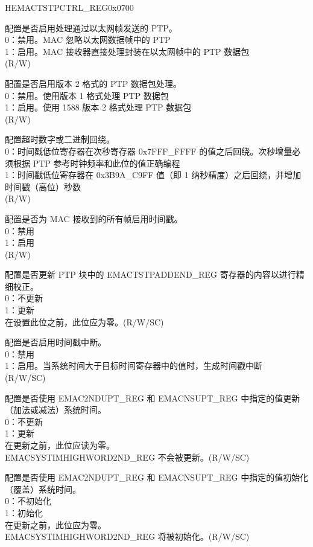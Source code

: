 \addtocounter{Regfloat}{-1}
\begin{register}{H}{EMACTSTPCTRL\_REG}{0x0700}
\begin{regdesc}\begin{reglist}
\item [接上页...]

\item [TSIPENA] 配置是否启用处理通过以太网帧发送的 PTP。\\
0：禁用。MAC 忽略以太网数据帧中的 PTP\\
1：启用。MAC 接收器直接处理封装在以太网帧中的 PTP 数据包\\(R/W)
\item [TSVER2ENA] 配置是否启用版本 2 格式的 PTP 数据包处理。\\
0：禁用。使用版本 1 格式处理 PTP 数据包\\
1：启用。使用 1588 版本 2 格式处理 PTP 数据包\\(R/W)
\item [TSCTRLSSR] 配置超时数字或二进制回绕。\\
0：时间戳低位寄存器在次秒寄存器 0x7FFF\_FFFF 的值之后回绕。次秒增量必须根据 PTP 参考时钟频率和此位的值正确编程\\
1：时间戳低位寄存器在 0x3B9A\_C9FF 值（即 1 纳秒精度）之后回绕，并增加时间戳（高位）秒数\\
(R/W)
\item [TSENALL] 配置是否为 MAC 接收到的所有帧启用时间戳。\\
0：禁用\\
1：启用\\(R/W)
\item [TSADDREG] 配置是否更新 PTP 块中的 EMACTSTPADDEND\_REG 寄存器的内容以进行精细校正。\\
0：不更新\\
1：更新\\
在设置此位之前，此位应为零。(R/W/SC)
\item [TSTRIG] 配置是否启用时间戳中断。\\
0：禁用\\
1：启用。当系统时间大于目标时间寄存器中的值时，生成时间戳中断\\(R/W/SC)
\item [TSUPDT] 配置是否使用 EMAC2NDUPT\_REG 和 EMACNSUPT\_REG 中指定的值更新（加法或减法）系统时间。\\
0：不更新\\
1：更新\\
在更新之前，此位应读为零。\\
EMACSYSTIMHIGHWORD2ND\_REG 不会被更新。(R/W/SC)
\item [TSINIT] 配置是否使用 EMAC2NDUPT\_REG 和 EMACNSUPT\_REG 中指定的值初始化（覆盖）系统时间。\\
0：不初始化\\
1：初始化\\
在更新之前，此位应为零。\\
EMACSYSTIMHIGHWORD2ND\_REG 将被初始化。(R/W/SC)

\item [见下页...]
\end{reglist}\end{regdesc}
\end{register}

